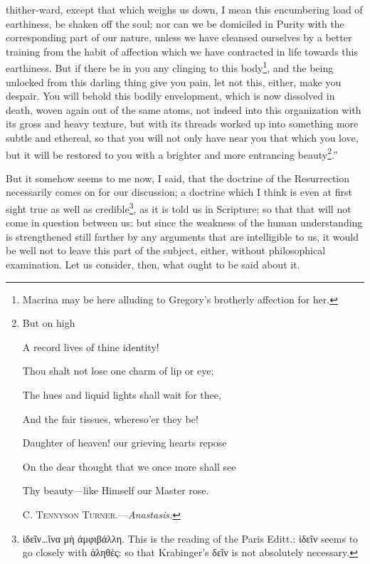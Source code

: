 thither-ward, except that which weighs us down, I mean this encumbering load of earthiness, be shaken off the soul; nor can we be domiciled in Purity with the corresponding part of our nature, unless we have cleansed ourselves by a better training from the habit of affection which we have contracted in life towards this earthiness. But if there be in you any clinging to this body\footnote{Macrina may be here alluding to Gregory’s brotherly affection for her.}, and the being unlocked from this darling thing give you pain, let not this, either, make you despair. You will behold this bodily envelopment, which is now dissolved in death, woven again out of the same atoms, not indeed into this organization with its gross and heavy texture, but with its threads worked up into something more subtle and ethereal, so that you will not only have near you that which you love, but it will be restored to you with a brighter and more entrancing beauty\footnote{But on high \par A record lives of thine identity! \par Thou shalt not lose one charm of lip or eye; \par The hues and liquid lights shall wait for thee, \par And the fair tissues, whereso’er they be! \par Daughter of heaven! our grieving hearts repose \par On the dear thought that we once more shall see \par Thy beauty—like Himself our Master rose. \par C. \textsc{Tennyson Turner.}—\emph{Anastasis.}}.”

But it somehow seems to me now, I said, that the doctrine of the Resurrection necessarily comes on for our discussion; a doctrine which I think is even at first sight true as well as credible\footnote{\textgreek{ἰδεῖν}…\textgreek{ἵνα μὴ ἀμφιβάλλη}. This is the reading of the Paris Editt.: \textgreek{ἰδεῖν} seems to go closely with \textgreek{ἀληθὲς}: so that Krabinger’s \textgreek{δεῖν} is not absolutely necessary.}, as it is told us in Scripture; so that that will not come in question between us: but since the weakness of the human understanding is strengthened still farther by any arguments that are intelligible to us, it would be well not to leave this part of the subject, either, without philosophical examination. Let us consider, then, what ought to be said about it.

